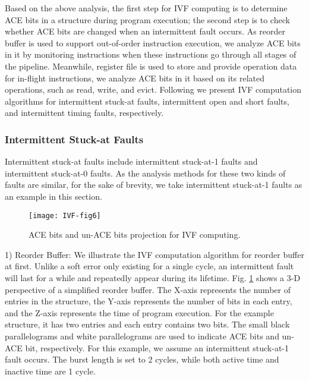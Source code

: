 Based on the above analysis, the first step for IVF computing is to determine ACE bits in a structure during program execution; the second step is to check whether ACE bits are changed when an intermittent fault occurs. As reorder buffer is used to support out-of-order instruction execution, we analyze ACE bits in it by monitoring instructions when these instructions go through all stages of the pipeline. Meanwhile, register file is used to store and provide operation data for in-flight instructions, we analyze ACE bits in it based on its related operations, such as read, write, and evict. Following we present IVF computation algorithms for intermittent stuck-at faults, intermittent open and short faults, and intermittent timing faults, respectively.

\subsubsection{Intermittent Stuck-at Faults}
Intermittent stuck-at faults include intermittent stuck-at-1 faults and intermittent stuck-at-0 faults. As the analysis methods for these two kinds of faults are similar, for the sake of brevity, we take intermittent stuck-at-1 faults as an example in this section.

\begin{figure}[t]
    \centering
    \texttt{[image: IVF-fig6]}\\
    \caption{ACE bits and un-ACE bits projection for IVF computing.}
    \label{fig:ACEbits}
\end{figure}

1) Reorder Buffer: We illustrate the IVF computation algorithm for reorder buffer at first. Unlike a soft error only existing for a single cycle, an intermittent fault will last for a while and repeatedly appear during its lifetime. Fig. \ref{fig:ACEbits} shows a 3-D perspective of a simplified reorder buffer. The X-axis represents the number of entries in the structure, the Y-axis represents the number of bits in each entry, and the Z-axis represents the time of program execution. For the example structure, it has two entries and each entry contains two bits. The small black parallelograms and white parallelograms are used to indicate ACE bits and un-ACE bit, respectively. For this example, we assume an intermittent stuck-at-1 fault occurs. The burst length is set to 2 cycles, while both active time and inactive time are 1 cycle.

